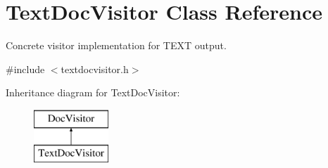 \hypertarget{class_text_doc_visitor}{}\section{Text\+Doc\+Visitor Class Reference}
\label{class_text_doc_visitor}


Concrete visitor implementation for T\+E\+XT output.  




{\ttfamily \#include $<$textdocvisitor.\+h$>$}

Inheritance diagram for Text\+Doc\+Visitor\+:\begin{figure}[H]
\begin{center}
\leavevmode
\includegraphics[height=2.000000cm]{class_text_doc_visitor}
\end{center}
\end{figure}
